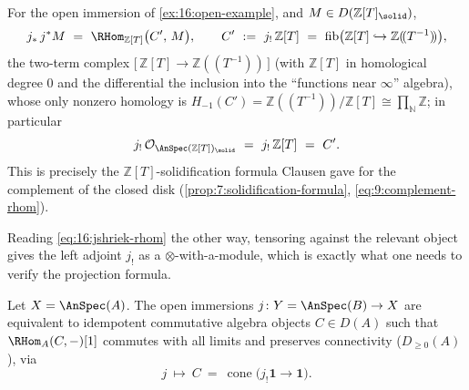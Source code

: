 \begin{proposition}
\label{prop:16:jshriek-formula}
For the open immersion of \cref{ex:16:open-example}, and $M\in D(\mathbb{Z}[T]_\solid)$,
\begin{equation}
\label{eq:16:jshriek-rhom}
j_*\,j^*M\ =\ \RHom_{\mathbb{Z}[T]}\bigl(C',\,M\bigr),\qquad
C'\ :=\ j_!\,\mathbb{Z}[T]\ =\ \operatorname{fib}\bigl(\mathbb{Z}[T]\hookrightarrow\mathbb{Z}(\!(T^{-1})\!)\bigr),
\end{equation}
the two-term complex $\bigl[\,\mathbb{Z}[T]\to\mathbb{Z}(\!(T^{-1})\!)\,\bigr]$ (with
$\mathbb{Z}[T]$ in homological degree $0$ and the differential the inclusion into the
``functions near $\infty$'' algebra), whose only nonzero homology is
$H_{-1}(C')=\mathbb{Z}(\!(T^{-1})\!)/\mathbb{Z}[T]\cong\prod_{\mathbb{N}}\mathbb{Z}$; in
particular
\begin{equation*}
j_!\,\mathcal{O}_{\AnSpec(\mathbb{Z}[T])_\solid}\ =\ j_!\,\mathbb{Z}[T]\ =\ C'.
\end{equation*}
This is precisely the $\mathbb{Z}[T]$-solidification formula Clausen gave for the
complement of the closed disk (\cref{prop:7:solidification-formula},
\cref{eq:9:complement-rhom}).
\end{proposition}

Reading \eqref{eq:16:jshriek-rhom} the other way, tensoring against the relevant object
gives the left adjoint $j_!$ as a $\otimes$-with-a-module, which is exactly what one
needs to verify the projection formula.

\begin{proposition}[Open immersions $=$ idempotent algebras]
\label{prop:16:open-idempotent}
Let $X=\AnSpec(A)$. The open immersions $j\colon Y=\AnSpec(B)\to X$ are equivalent to
idempotent commutative algebra objects $C\in D(A)$ such that $\RHom_A(C,-)[1]$ commutes
with all limits and preserves connectivity ($D_{\ge0}(A)$), via
\begin{equation*}
j\ \longmapsto\ C\ =\ \operatorname{cone}\bigl(j_!\mathbf 1\to\mathbf 1\bigr).
\end{equation*}
\end{proposition}

